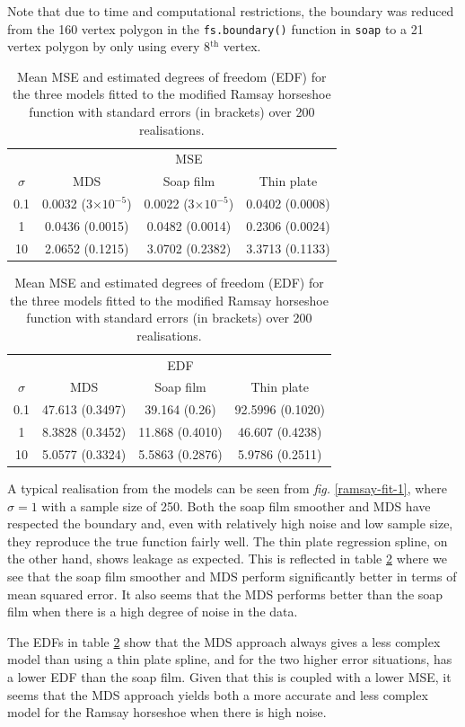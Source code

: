 \documentclass[a4paper,10pt]{article}
\newcommand{\fig}[1]{\emph{fig.} \ref{#1}}
\newcommand{\cross}{\times}
\begin{document}
Note that due to time and computational restrictions, the boundary was reduced from the 160 vertex polygon in the \texttt{fs.boundary()} function in \texttt{soap} to a 21 vertex polygon by only using every 8$^\text{th}$ vertex.

\begin{table}[ht]
\centering
\begin{tabular}{c c c c}
 & & MSE & \\ 
$\sigma$ & MDS & Soap film & Thin plate\\ 
\hline
0.1  & 0.0032 (3$\cross10^{-5}$) & 0.0022 (3$\cross10^{-5}$) & 0.0402 (0.0008) \\ 
1  & 0.0436 (0.0015) & 0.0482 (0.0014) & 0.2306 (0.0024) \\ 
10  & 2.0652 (0.1215) & 3.0702 (0.2382) & 3.3713 (0.1133) \\ 
\end{tabular}
\begin{tabular}{c  c c c }
&  & EDF & \\ 
$\sigma$ & MDS & Soap film & Thin plate\\ 
\hline
0.1 & 47.613 (0.3497) & 39.164 (0.26) & 92.5996 (0.1020)\\ 
1  & 8.3828 (0.3452) & 11.868 (0.4010) & 46.607 (0.4238)\\ 
10 & 5.0577 (0.3324) & 5.5863 (0.2876) & 5.9786 (0.2511)\\ 
\end{tabular}
\caption{Mean MSE and estimated degrees of freedom (EDF) for the three models fitted to the modified Ramsay horseshoe function with standard errors (in brackets) over 200 realisations.}
\label{ramsayresultstable}
\end{table}

A typical realisation from the models can be seen from \fig{ramsay-fit-1}, where $\sigma=1$ with a sample size of 250. Both the soap film smoother and MDS have respected the boundary and, even with relatively high noise and low sample size, they reproduce the true function fairly well. The thin plate regression spline, on the other hand, shows leakage as expected. This is reflected in table \ref{ramsayresultstable} where we see that the soap film smoother and MDS perform significantly better in terms of mean squared error. It also seems that the MDS performs better than the soap film when there is a high degree of noise in the data.

The EDFs in table \ref{ramsayresultstable} show that the MDS approach always gives a less complex model than using a thin plate spline, and for the two higher error situations, has a lower EDF than the soap film. Given that this is coupled with a lower MSE, it seems that the MDS approach yields both a more accurate and less complex model for the Ramsay horseshoe when there is high noise.
\end{document}
